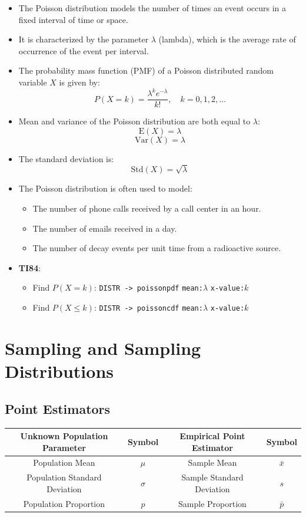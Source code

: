 \documentclass{article}
\newcommand{\code}[1]{\colorbox{light-gray}{\texttt{#1}}}
\begin{document}
\begin{itemize}
    \item The Poisson distribution models the number of times an event occurs in a fixed interval of time or space.
    \item It is characterized by the parameter $\lambda$ (lambda), which is the average rate of occurrence of the event per interval.
    \item The probability mass function (PMF) of a Poisson distributed random variable $X$ is given by:
    \[
    P(X = k) = \frac{\lambda^k e^{-\lambda}}{k!}, \quad k = 0, 1, 2, \ldots
    \]
    \item Mean and variance of the Poisson distribution are both equal to $\lambda$:
    \[
    \text{E}(X) = \lambda
    \]
    \[
    \text{Var}(X) = \lambda
    \]
    \item The standard deviation is:
    \[
    \text{Std}(X) = \sqrt{\lambda}
    \]
    \item The Poisson distribution is often used to model:
    \begin{itemize}
        \item The number of phone calls received by a call center in an hour.
        \item The number of emails received in a day.
        \item The number of decay events per unit time from a radioactive source.
    \end{itemize}
    \item \textbf{TI84}:
    \begin{itemize}
        \item Find $P(X = k)$: \code{DISTR -> poissonpdf} \code{mean:$\lambda$} \code{x-value:$k$}
        \item Find $P(X \leq k)$: \code{DISTR -> poissoncdf} \code{mean:$\lambda$} \code{x-value:$k$}
    \end{itemize}
\end{itemize}


\section{Sampling and Sampling Distributions}

\subsection{Point Estimators}

\begin{table}[H]
\centering
\begin{tabular}{|c|c|c|c|}
\hline
\textbf{Unknown Population Parameter} & \textbf{Symbol} & \textbf{Empirical Point Estimator} & \textbf{Symbol} \\ \hline
Population Mean & $\mu$ & Sample Mean & $\bar{x}$ \\ \hline
Population Standard Deviation & $\sigma$ & Sample Standard Deviation & $s$ \\ \hline
Population Proportion & $p$ & Sample Proportion & $\bar{p}$ \\ \hline
\end{tabular}
\end{table}
\end{document}
